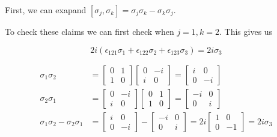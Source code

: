 \documentclass[11pt]{article}
\begin{document}
\begin{enumerate}
\begin{enumerate}
		            First, we can exapand $[\sigma_j, \sigma_k] = \sigma_j \sigma_k - \sigma_k \sigma_j$.

		            To check these claims we can first check when $j = 1, k =2$. This gives us

		            \begin{equation*}
			            2i(\epsilon_{121} \sigma_1 + \epsilon_{122} \sigma_2 + \epsilon_{123} \sigma_3) = 2i\sigma_3
		            \end{equation*}

		            \begin{align*}
			            \sigma_1 \sigma_2                     & =
			            \begin{bmatrix}
				            0 & 1 \\ 1 & 0
			            \end{bmatrix}
			            \begin{bmatrix}
				            0 & -i \\ i & 0
			            \end{bmatrix} =
			            \begin{bmatrix}
				            i & 0 \\ 0 & -i
			            \end{bmatrix}                           \\
			            \sigma_2 \sigma_1                     & =
			            \begin{bmatrix}
				            0 & -i \\ i & 0
			            \end{bmatrix}
			            \begin{bmatrix}
				            0 & 1 \\ 1 & 0
			            \end{bmatrix} =
			            \begin{bmatrix}
				            -i & 0 \\ 0 & i
			            \end{bmatrix}                           \\
			            \sigma_1 \sigma_2 - \sigma_2 \sigma_1 & =
			            \begin{bmatrix}
				            i & 0 \\ 0 & -i
			            \end{bmatrix} -
			            \begin{bmatrix}
				            -i & 0 \\ 0 & i
			            \end{bmatrix} =
			            2i \begin{bmatrix}
				               1 & 0 \\ 0 & -1
			               \end{bmatrix} = 2i\sigma_3
		            \end{align*}


\end{enumerate}
\end{enumerate}
\end{document}
